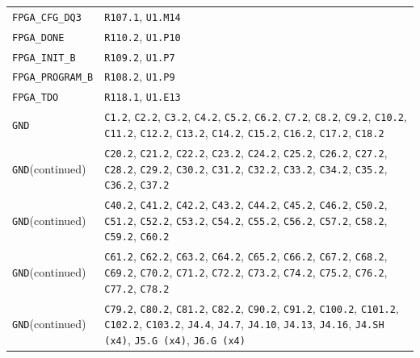 \documentclass[11pt,a4paper]{article}
\begin{document}
\begin{longtable}{@{}P{49mm}P{123mm}@{}}
\nolinkurl{FPGA_CFG_DQ3} & \nolinkurl{R107.1}, \nolinkurl{U1.M14} \\
\nolinkurl{FPGA_DONE} & \nolinkurl{R110.2}, \nolinkurl{U1.P10} \\
\nolinkurl{FPGA_INIT_B} & \nolinkurl{R109.2}, \nolinkurl{U1.P7} \\
\nolinkurl{FPGA_PROGRAM_B} & \nolinkurl{R108.2}, \nolinkurl{U1.P9} \\
\nolinkurl{FPGA_TDO} & \nolinkurl{R118.1}, \nolinkurl{U1.E13} \\
\nolinkurl{GND} & \nolinkurl{C1.2}, \nolinkurl{C2.2}, \nolinkurl{C3.2}, \nolinkurl{C4.2}, \nolinkurl{C5.2}, \nolinkurl{C6.2}, \nolinkurl{C7.2}, \nolinkurl{C8.2}, \nolinkurl{C9.2}, \nolinkurl{C10.2}, \nolinkurl{C11.2}, \nolinkurl{C12.2}, \nolinkurl{C13.2}, \nolinkurl{C14.2}, \nolinkurl{C15.2}, \nolinkurl{C16.2}, \nolinkurl{C17.2}, \nolinkurl{C18.2} \\
\nolinkurl{GND}\newline (continued) & \nolinkurl{C20.2}, \nolinkurl{C21.2}, \nolinkurl{C22.2}, \nolinkurl{C23.2}, \nolinkurl{C24.2}, \nolinkurl{C25.2}, \nolinkurl{C26.2}, \nolinkurl{C27.2}, \nolinkurl{C28.2}, \nolinkurl{C29.2}, \nolinkurl{C30.2}, \nolinkurl{C31.2}, \nolinkurl{C32.2}, \nolinkurl{C33.2}, \nolinkurl{C34.2}, \nolinkurl{C35.2}, \nolinkurl{C36.2}, \nolinkurl{C37.2} \\
\nolinkurl{GND}\newline (continued) & \nolinkurl{C40.2}, \nolinkurl{C41.2}, \nolinkurl{C42.2}, \nolinkurl{C43.2}, \nolinkurl{C44.2}, \nolinkurl{C45.2}, \nolinkurl{C46.2}, \nolinkurl{C50.2}, \nolinkurl{C51.2}, \nolinkurl{C52.2}, \nolinkurl{C53.2}, \nolinkurl{C54.2}, \nolinkurl{C55.2}, \nolinkurl{C56.2}, \nolinkurl{C57.2}, \nolinkurl{C58.2}, \nolinkurl{C59.2}, \nolinkurl{C60.2} \\
\nolinkurl{GND}\newline (continued) & \nolinkurl{C61.2}, \nolinkurl{C62.2}, \nolinkurl{C63.2}, \nolinkurl{C64.2}, \nolinkurl{C65.2}, \nolinkurl{C66.2}, \nolinkurl{C67.2}, \nolinkurl{C68.2}, \nolinkurl{C69.2}, \nolinkurl{C70.2}, \nolinkurl{C71.2}, \nolinkurl{C72.2}, \nolinkurl{C73.2}, \nolinkurl{C74.2}, \nolinkurl{C75.2}, \nolinkurl{C76.2}, \nolinkurl{C77.2}, \nolinkurl{C78.2} \\
\nolinkurl{GND}\newline (continued) & \nolinkurl{C79.2}, \nolinkurl{C80.2}, \nolinkurl{C81.2}, \nolinkurl{C82.2}, \nolinkurl{C90.2}, \nolinkurl{C91.2}, \nolinkurl{C100.2}, \nolinkurl{C101.2}, \nolinkurl{C102.2}, \nolinkurl{C103.2}, \nolinkurl{J4.4}, \nolinkurl{J4.7}, \nolinkurl{J4.10}, \nolinkurl{J4.13}, \nolinkurl{J4.16}, \nolinkurl{J4.SH (x4)}, \nolinkurl{J5.G (x4)}, \nolinkurl{J6.G (x4)} \\

\end{longtable}
\end{document}
